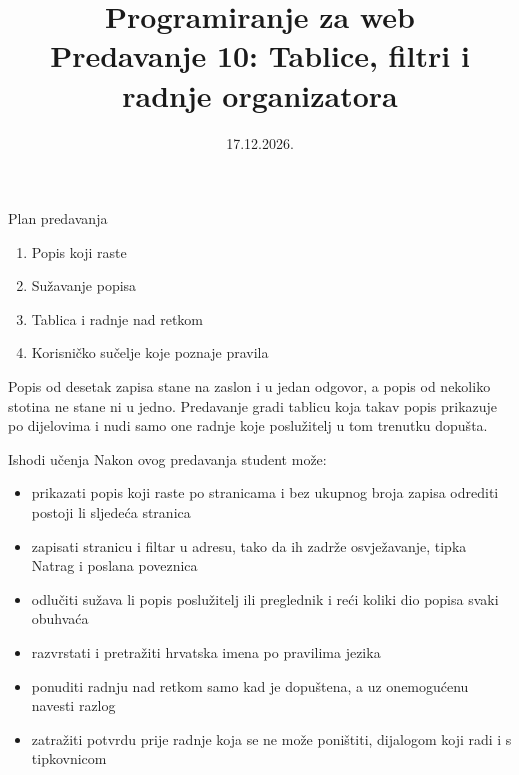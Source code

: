 

\title[Predavanje 10: Tablice i filtri]{Programiranje za web \\ Predavanje 10: Tablice, filtri i radnje organizatora}
\date{17.12.2026.}



\frame{\titlepage}

\begin{frame}{Plan predavanja}
\begin{enumerate}
  \item Popis koji raste
  \item Sužavanje popisa
  \item Tablica i radnje nad retkom
  \item Korisničko sučelje koje poznaje pravila
\end{enumerate}

\vspace{0.6em}
Popis od desetak zapisa stane na zaslon i u jedan odgovor, a popis od nekoliko stotina ne stane ni u jedno. Predavanje gradi tablicu koja takav popis prikazuje po dijelovima i nudi samo one radnje koje poslužitelj u tom trenutku dopušta.
\end{frame}

\begin{frame}{Ishodi učenja}
Nakon ovog predavanja student može:

\begin{itemize}
  \itemsep0.2em
  \item prikazati popis koji raste po stranicama i bez ukupnog broja zapisa odrediti postoji li sljedeća stranica
  \item zapisati stranicu i filtar u adresu, tako da ih zadrže osvježavanje, tipka Natrag i poslana poveznica
  \item odlučiti sužava li popis poslužitelj ili preglednik i reći koliki dio popisa svaki obuhvaća
  \item razvrstati i pretražiti hrvatska imena po pravilima jezika
  \item ponuditi radnju nad retkom samo kad je dopuštena, a uz onemogućenu navesti razlog
  \item zatražiti potvrdu prije radnje koja se ne može poništiti, dijalogom koji radi i s tipkovnicom
\end{itemize}
\end{frame}

